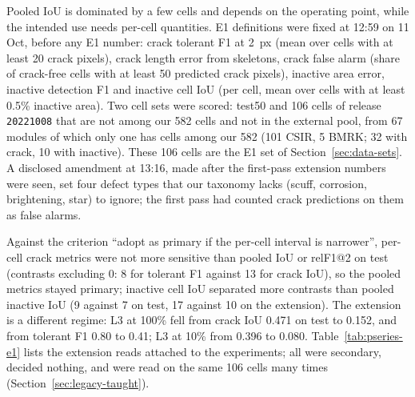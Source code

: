 Pooled IoU is dominated by a few cells and depends on the operating point, while the intended use needs per-cell quantities. E1
definitions were fixed at 12:59 on 11 Oct, before any E1 number: crack tolerant F1 at 2~px (mean over cells with at least 20 crack
pixels), crack length error from skeletons, crack false alarm (share of crack-free cells with at least 50 predicted crack pixels),
inactive area error, inactive detection F1 and inactive cell IoU (per cell, mean over cells with at least 0.5\% inactive area). Two
cell sets were scored: test50 and 106 cells of release \texttt{20221008} that are not among our 582 cells and not in the external pool,
from 67 modules of which only one has cells among our 582 (101 CSIR, 5 BMRK; 32 with crack, 10 with inactive). These 106 cells are
the E1 set of Section~\ref{sec:data-sets}. A disclosed amendment at 13:16, made after the first-pass extension numbers were seen,
set four defect types that our taxonomy lacks (scuff, corrosion, brightening, star) to ignore; the first pass had counted crack
predictions on them as false alarms.

Against the criterion ``adopt as primary if the per-cell interval is narrower'', per-cell crack metrics were not more sensitive than
pooled IoU or relF1@2 on test (contrasts excluding 0: 8 for tolerant F1 against 13 for crack IoU), so the pooled metrics stayed
primary; inactive cell IoU separated more contrasts than pooled inactive IoU (9 against 7 on test, 17 against 10 on the extension).
The extension is a different regime: L3 at 100\% fell from crack IoU 0.471 on test to 0.152, and from tolerant F1 0.80 to 0.41;
L3 at 10\% from 0.396 to 0.080. Table~\ref{tab:pseries-e1} lists the extension reads attached to the experiments; all were
secondary, decided nothing, and were read on the same 106 cells many times (Section~\ref{sec:legacy-taught}).

